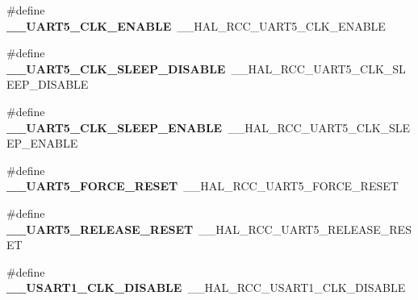 \begin{DoxyCompactItemize}
\item 
\mbox{\label{group___h_a_l___r_c_c___aliased_ga7b4b49db3dac7e83c37beed3dfd19980}} 
\#define {\bfseries \+\_\+\+\_\+\+U\+A\+R\+T5\+\_\+\+C\+L\+K\+\_\+\+E\+N\+A\+B\+LE}~\+\_\+\+\_\+\+H\+A\+L\+\_\+\+R\+C\+C\+\_\+\+U\+A\+R\+T5\+\_\+\+C\+L\+K\+\_\+\+E\+N\+A\+B\+LE
\item 
\mbox{\label{group___h_a_l___r_c_c___aliased_ga82f8f6e08fbeea0ab37d22c5d02526ea}} 
\#define {\bfseries \+\_\+\+\_\+\+U\+A\+R\+T5\+\_\+\+C\+L\+K\+\_\+\+S\+L\+E\+E\+P\+\_\+\+D\+I\+S\+A\+B\+LE}~\+\_\+\+\_\+\+H\+A\+L\+\_\+\+R\+C\+C\+\_\+\+U\+A\+R\+T5\+\_\+\+C\+L\+K\+\_\+\+S\+L\+E\+E\+P\+\_\+\+D\+I\+S\+A\+B\+LE
\item 
\mbox{\label{group___h_a_l___r_c_c___aliased_ga4a91f9d4af6a747b6e37e343101c4757}} 
\#define {\bfseries \+\_\+\+\_\+\+U\+A\+R\+T5\+\_\+\+C\+L\+K\+\_\+\+S\+L\+E\+E\+P\+\_\+\+E\+N\+A\+B\+LE}~\+\_\+\+\_\+\+H\+A\+L\+\_\+\+R\+C\+C\+\_\+\+U\+A\+R\+T5\+\_\+\+C\+L\+K\+\_\+\+S\+L\+E\+E\+P\+\_\+\+E\+N\+A\+B\+LE
\item 
\mbox{\label{group___h_a_l___r_c_c___aliased_gaa862c1dd316cef6f49cf1d8b75fc98ab}} 
\#define {\bfseries \+\_\+\+\_\+\+U\+A\+R\+T5\+\_\+\+F\+O\+R\+C\+E\+\_\+\+R\+E\+S\+ET}~\+\_\+\+\_\+\+H\+A\+L\+\_\+\+R\+C\+C\+\_\+\+U\+A\+R\+T5\+\_\+\+F\+O\+R\+C\+E\+\_\+\+R\+E\+S\+ET
\item 
\mbox{\label{group___h_a_l___r_c_c___aliased_gac1d6aac067f40a8881b272393db61725}} 
\#define {\bfseries \+\_\+\+\_\+\+U\+A\+R\+T5\+\_\+\+R\+E\+L\+E\+A\+S\+E\+\_\+\+R\+E\+S\+ET}~\+\_\+\+\_\+\+H\+A\+L\+\_\+\+R\+C\+C\+\_\+\+U\+A\+R\+T5\+\_\+\+R\+E\+L\+E\+A\+S\+E\+\_\+\+R\+E\+S\+ET
\item 
\mbox{\label{group___h_a_l___r_c_c___aliased_gaa5da6139eb7a5c1432f3bbdb29021f03}} 
\#define {\bfseries \+\_\+\+\_\+\+U\+S\+A\+R\+T1\+\_\+\+C\+L\+K\+\_\+\+D\+I\+S\+A\+B\+LE}~\+\_\+\+\_\+\+H\+A\+L\+\_\+\+R\+C\+C\+\_\+\+U\+S\+A\+R\+T1\+\_\+\+C\+L\+K\+\_\+\+D\+I\+S\+A\+B\+LE
\item 
\mbox{\label{group___h_a_l___r_c_c___aliased_gae10e7a83f9766bc578dbc39727751fa8}} 

\end{DoxyCompactItemize}

